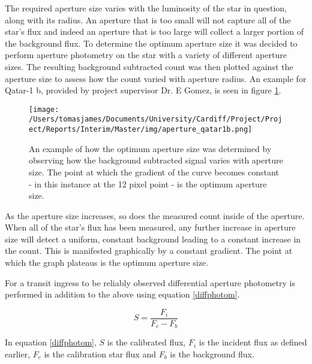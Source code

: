 \documentclass{article}
\begin{document}
The required aperture size varies with the luminosity of the star in question, along with its radius. An aperture that is too small will not capture all of the star's flux and indeed an aperture that is too large will collect a larger portion of the background flux. To determine the optimum aperture size it was decided to perform aperture photometry on the star with a variety of different aperture sizes.  The resulting background subtracted count was then plotted against the aperture size to assess how the count varied with aperture radius. An example for Qatar-1 b, provided by project supervisor Dr. E Gomez, is seen in figure \ref{qatar1b}.

\begin{figure}
\centering
    \texttt{[image: /Users/tomasjames/Documents/University/Cardiff/Project/Project/Reports/Interim/Master/img/aperture\_qatar1b.png]}
\caption[An example of how the optimum aperture size was determined by observing how the background subtracted signal varies with aperture size. The point at which the gradient of the curve becomes constant - in this instance at the 12 pixel point - is the optimum aperture size.]{An example of how the optimum aperture size was determined by observing how the background subtracted signal varies with aperture size. The point at which the gradient of the curve becomes constant - in this instance at the 12 pixel point - is the optimum aperture size.} \label{qatar1b}
\end{figure}

As the aperture size increases, so does the measured count inside of the aperture. When all of the star's flux has been measured, any further increase in aperture size will detect a uniform, constant background leading to a constant increase in the count. This is manifested graphically by a constant gradient. The point at which the graph plateaus is the optimum aperture size.

For a transit ingress to be reliably observed differential aperture photometry is performed in addition to the above using equation \ref{diffphotom}. 

\begin{equation} \label{diffphotom}
    S = \frac{F_{i}}{F_{c}-F_{b}}
\end{equation}

In equation \ref{diffphotom}, $S$ is the calibrated flux, $F_{i}$ is the incident flux as defined earlier, $F_{c}$ is the calibration star flux and $F_{b}$ is the background flux.
\end{document}
